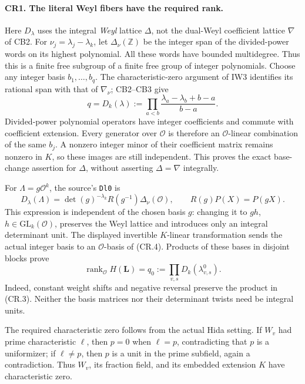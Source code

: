 \paragraph{CR1. The literal Weyl fibers have the required rank.}
Here $D_\lambda$ uses the integral \emph{Weyl} lattice $\Delta$,
not the dual-Weyl coefficient lattice $\nabla$ of CB2.
For $\nu_j=\lambda_j-\lambda_k$, let $\Delta_\nu(\mathbb Z)$ be the
integer span of the divided-power words on its highest polynomial.
All these words have bounded multidegree. Thus this is a finite free
subgroup of a finite free group of integer polynomials. Choose any
integer basis $b_1,\ldots,b_q$. The characteristic-zero argument of IW3
identifies its rational span with that of $\nabla_\nu$; CB2--CB3 give
\[
 q=D_k(\lambda):=
       \prod_{a<b}\frac{\lambda_a-\lambda_b+b-a}{b-a}.
                                                               \tag{CR.3}
\]
Divided-power polynomial operators have integer coefficients and commute
with coefficient extension. Every generator over $\mathcal O$ is
therefore an $\mathcal O$-linear combination of the same $b_j$.
A nonzero integer minor of their coefficient matrix remains nonzero in
$K$, so these images are still independent. This proves the exact
base-change assertion for $\Delta$, without asserting
$\Delta=\nabla$ integrally.

For $\Lambda=g\mathcal O^k$, the source's \texttt{Dl0} is
\[
 D_\lambda(\Lambda)
   =\det(g)^{-\lambda_k}R(g^{-1})\Delta_\nu(\mathcal O),
       \qquad R(g)P(X)=P(gX).                            \tag{CR.4}
\]
This expression is independent of the chosen basis $g$:
changing it to $gh$, $h\in\mathrm{GL}_k(\mathcal O)$, preserves
the Weyl lattice and introduces only an integral determinant unit.
The displayed invertible $K$-linear transformation sends the actual
integer basis to an $\mathcal O$-basis of (CR.4).
Products of these bases in disjoint blocks prove
\[
 \operatorname{rank}_{\mathcal O}H(\mathbf L)
    =q_0:=\prod_{v,s}D_k(\lambda^0_{v,s}).                \tag{CR.5}
\]
Indeed, constant weight shifts and negative reversal preserve the
product in (CR.3). Neither the basis matrices nor their determinant
twists need be integral units.

The required characteristic zero follows from the actual Hida setting.
If $W_v$ had prime characteristic $\ell$, then $p=0$ when $\ell=p$,
contradicting that $p$ is a uniformizer; if $\ell\ne p$, then $p$ is a
unit in the prime subfield, again a contradiction. Thus $W_v$, its
fraction field, and its embedded extension $K$ have characteristic zero.

